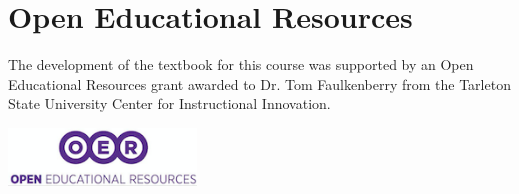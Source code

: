 \documentclass[10pt]{article}
\begin{document}
\section*{Open Educational Resources}
\label{sec:orge40fd03}
The development of the textbook for this course was supported by an Open Educational Resources grant awarded to Dr. Tom Faulkenberry from the Tarleton State University Center for Instructional Innovation.

\begin{center}
\includegraphics[width=5cm]{oerLogo.png}
\end{center}
\end{document}
